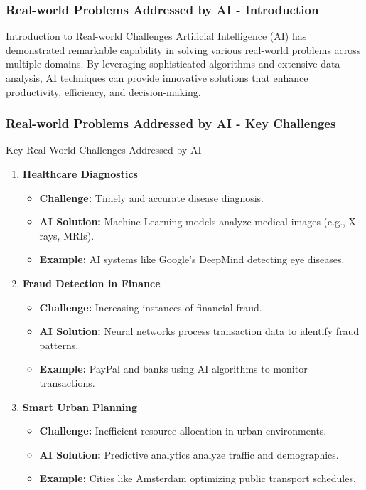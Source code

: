 \documentclass{beamer}
\begin{document}
\begin{frame}[fragile]
    \frametitle{Real-world Problems Addressed by AI - Introduction}
    \begin{block}{Introduction to Real-world Challenges}
        Artificial Intelligence (AI) has demonstrated remarkable capability in solving various real-world problems across multiple domains. By leveraging sophisticated algorithms and extensive data analysis, AI techniques can provide innovative solutions that enhance productivity, efficiency, and decision-making. 
    \end{block}
\end{frame}

\begin{frame}[fragile]
    \frametitle{Real-world Problems Addressed by AI - Key Challenges}
    \begin{block}{Key Real-World Challenges Addressed by AI}
        \begin{enumerate}
            \item \textbf{Healthcare Diagnostics}
                \begin{itemize}
                    \item \textbf{Challenge:} Timely and accurate disease diagnosis.
                    \item \textbf{AI Solution:} Machine Learning models analyze medical images (e.g., X-rays, MRIs).
                    \item \textbf{Example:} AI systems like Google's DeepMind detecting eye diseases.
                \end{itemize}
            \item \textbf{Fraud Detection in Finance}
                \begin{itemize}
                    \item \textbf{Challenge:} Increasing instances of financial fraud.
                    \item \textbf{AI Solution:} Neural networks process transaction data to identify fraud patterns.
                    \item \textbf{Example:} PayPal and banks using AI algorithms to monitor transactions.
                \end{itemize}
            \item \textbf{Smart Urban Planning}
                \begin{itemize}
                    \item \textbf{Challenge:} Inefficient resource allocation in urban environments.
                    \item \textbf{AI Solution:} Predictive analytics analyze traffic and demographics.
                    \item \textbf{Example:} Cities like Amsterdam optimizing public transport schedules.
                \end{itemize}
        \end{enumerate}
    \end{block}
\end{frame}
\end{document}
